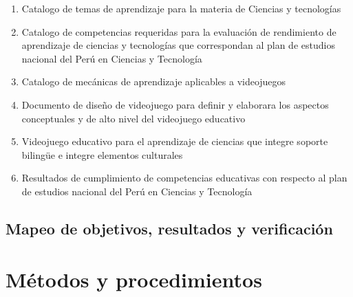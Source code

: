 
\begin{enumerate}[label=R\arabic*.,itemsep=5pt]
    \item Catalogo de temas de aprendizaje para la materia de Ciencias y tecnologías
    \item Catalogo de competencias requeridas para la evaluación de rendimiento de aprendizaje de ciencias y tecnologías que correspondan al plan de estudios nacional del Perú en Ciencias y Tecnología
    \item Catalogo de mecánicas de aprendizaje aplicables a videojuegos
    \item Documento de diseño de videojuego para definir y elaborara los aspectos conceptuales y de alto nivel del videojuego educativo
    \item Videojuego educativo para el aprendizaje de ciencias que integre soporte bilingüe e integre elementos culturales

    \item Resultados de cumplimiento de competencias educativas con respecto al plan de estudios nacional del Perú en Ciencias y Tecnología
\end{enumerate}


\subsection{Mapeo de objetivos, resultados y verificación}

\section{Métodos y procedimientos}